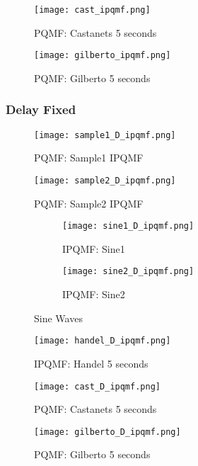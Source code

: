 \documentclass{article} %
\begin{document}
\begin{figure}[H]
\centering
\texttt{[image: cast\_ipqmf.png]}
\caption{PQMF: Castanets 5 seconds}
\end{figure}


\begin{figure}[H]
\centering
\texttt{[image: gilberto\_ipqmf.png]}
\caption{PQMF: Gilberto 5 seconds}
\end{figure}

\subsubsection{Delay Fixed}



\begin{figure}[H]
\centering
\texttt{[image: sample1\_D\_ipqmf.png]}
\caption{PQMF: Sample1 IPQMF}
\end{figure}
\begin{figure}[H]
\centering
\texttt{[image: sample2\_D\_ipqmf.png]}
\caption{PQMF: Sample2 IPQMF}
\end{figure}


\begin{figure}[H]

\begin{subfigure}{0.5\textwidth}
\centering
\texttt{[image: sine1\_D\_ipqmf.png]}
\caption{IPQMF: Sine1}
\end{subfigure}
\begin{subfigure}{0.5\textwidth}
\centering
\texttt{[image: sine2\_D\_ipqmf.png]}
\caption{IPQMF: Sine2}
\end{subfigure}
\caption{Sine Waves}
\end{figure}
 

\begin{figure}[H]
\centering
\texttt{[image: handel\_D\_ipqmf.png]}
\caption{IPQMF: Handel 5 seconds}
\end{figure}

\begin{figure}[H]
\centering
\texttt{[image: cast\_D\_ipqmf.png]}
\caption{PQMF: Castanets 5 seconds}
\end{figure}


\begin{figure}[H]
\centering
\texttt{[image: gilberto\_D\_ipqmf.png]}
\caption{PQMF: Gilberto 5 seconds}
\end{figure}
\end{document}
